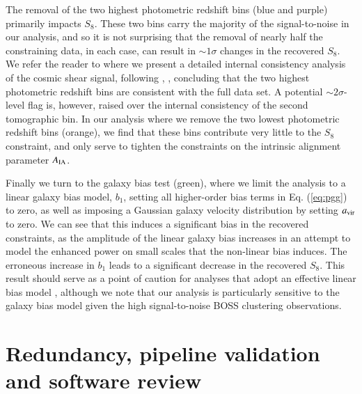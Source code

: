 \begin{appendix}
The removal of the two highest photometric redshift bins (blue and purple) primarily impacts $S_8$.   
These two bins carry the majority of the signal-to-noise in our analysis, and so it is not surprising that the removal of nearly half the constraining data, in each case, can result in $\sim 1 \sigma$ changes in the recovered $S_8$.   
We refer the reader to \citet{asgari/etal:inprep} where we present a detailed internal consistency analysis of the cosmic shear signal, following \citet{kohlinger/etal:2019}, \citep[see also][]{efstathiou/lemos:2018},  concluding that the two highest photometric redshift bins are consistent with the full data set.   
A potential $\sim 2\sigma$-level flag is, however, raised over the internal consistency of the second tomographic bin.  
In our analysis where we remove the two lowest photometric redshift bins (orange), we find that these bins contribute very little to the $S_8$ constraint, and only serve to tighten the constraints on the intrinsic alignment parameter $A_{\rm IA}$.

Finally we turn to the galaxy bias test (green), where we limit the analysis to a linear galaxy bias model, $b_1$, setting all higher-order bias terms in Eq. (\ref{eq:pgg}) to zero, as well as imposing a Gaussian galaxy velocity distribution by setting $a_{\rm vir}$ to zero.   
We can see that this induces a significant bias in the recovered constraints, as the amplitude of the linear galaxy bias increases in an attempt to model the enhanced power on small scales that the non-linear bias induces.   
The erroneous increase in $b_1$ leads to a significant decrease in the recovered $S_8$.  This result should serve as a point of caution for \tttp analyses that adopt an effective linear bias model \citep[see also the discussion in][]{asgari/etal:2020}, although we note that our analysis is particularly sensitive to the galaxy bias model given the high signal-to-noise BOSS clustering observations.


\section{Redundancy, pipeline validation and software review}
\label{app:codereview}


\end{appendix}
